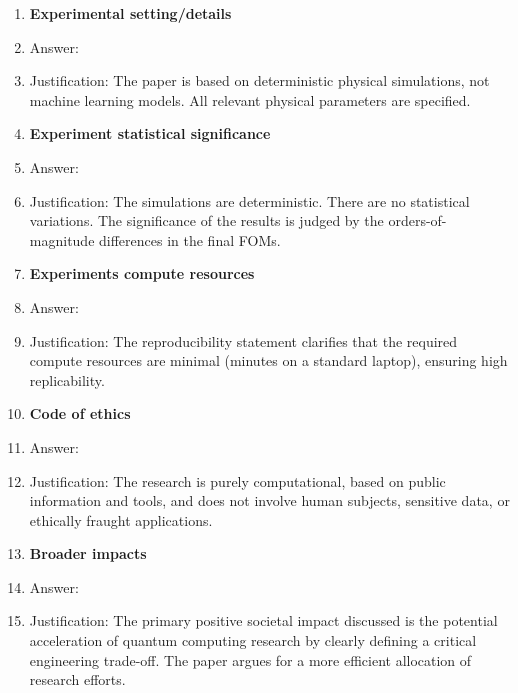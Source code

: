 \documentclass{article}
\begin{document}
\begin{enumerate}
\item {\bf Experimental setting/details}
    \item[] Answer: \answerNA{}
    \item[] Justification: The paper is based on deterministic physical simulations, not machine learning models. All relevant physical parameters are specified.

\item {\bf Experiment statistical significance}
    \item[] Answer: \answerNA{}
    \item[] Justification: The simulations are deterministic. There are no statistical variations. The significance of the results is judged by the orders-of-magnitude differences in the final FOMs.

\item {\bf Experiments compute resources}
    \item[] Answer: \answerYes{}
    \item[] Justification: The reproducibility statement clarifies that the required compute resources are minimal (minutes on a standard laptop), ensuring high replicability.

\item {\bf Code of ethics}
    \item[] Answer: \answerYes{}
    \item[] Justification: The research is purely computational, based on public information and tools, and does not involve human subjects, sensitive data, or ethically fraught applications.

\item {\bf Broader impacts}
    \item[] Answer: \answerYes{}
    \item[] Justification: The primary positive societal impact discussed is the potential acceleration of quantum computing research by clearly defining a critical engineering trade-off. The paper argues for a more efficient allocation of research efforts.
\end{enumerate}
\end{document}
